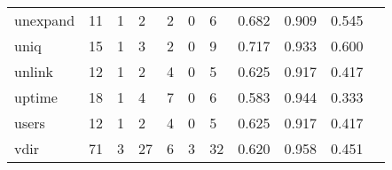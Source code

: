 \begin{longtable}{lp{1.2cm}p{1.2cm}p{1.2cm}p{1.2cm}p{1.2cm}p{1.2cm}p{1.2cm}p{1.2cm}p{1.2cm}p{1.2cm}}
unexpand  &                                    11 &                                                  1 &                                                  2 &                                                  2 &                                                  0 &                                                  6 &                                              0.682 &                                              0.909 &                                              0.545 \\
uniq      &                                    15 &                                                  1 &                                                  3 &                                                  2 &                                                  0 &                                                  9 &                                              0.717 &                                              0.933 &                                              0.600 \\
unlink    &                                    12 &                                                  1 &                                                  2 &                                                  4 &                                                  0 &                                                  5 &                                              0.625 &                                              0.917 &                                              0.417 \\
uptime    &                                    18 &                                                  1 &                                                  4 &                                                  7 &                                                  0 &                                                  6 &                                              0.583 &                                              0.944 &                                              0.333 \\
users     &                                    12 &                                                  1 &                                                  2 &                                                  4 &                                                  0 &                                                  5 &                                              0.625 &                                              0.917 &                                              0.417 \\
vdir      &                                    71 &                                                  3 &                                                 27 &                                                  6 &                                                  3 &                                                 32 &                                              0.620 &                                              0.958 &                                              0.451 \\

\end{longtable}
